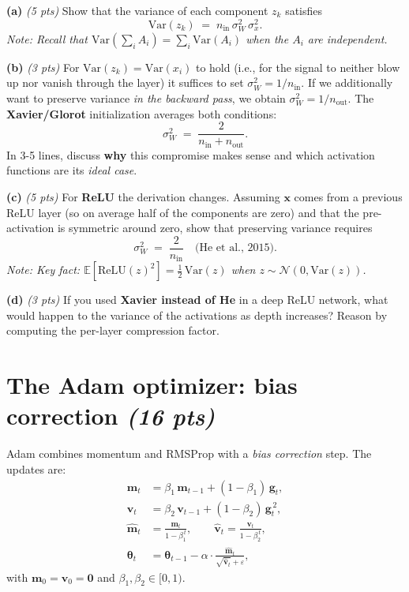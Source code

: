 \documentclass[11pt,letterpaper]{article}
\newcommand{\E}{\mathbb{E}}
\newcommand{\Var}{\mathrm{Var}}
\newcommand{\relu}{\mathrm{ReLU}}
\newcommand{\pts}[1]{\textit{(#1 pts)}\;}
\newcommand{\note}[1]{\textit{\small Note: #1}}
\begin{document}
\textbf{(a)} \pts{5} Show that the variance of each component $z_k$ satisfies
$$
\Var(z_k) \;=\; n_{\text{in}}\, \sigma_W^2\, \sigma_x^2.
$$
\note{Recall that $\Var(\sum_i A_i) = \sum_i \Var(A_i)$ when the $A_i$ are independent.}

\textbf{(b)} \pts{3} For $\Var(z_k) = \Var(x_i)$ to hold (i.e., for the signal
to neither blow up nor vanish through the layer) it suffices to set
$\sigma_W^2 = 1/n_{\text{in}}$. If we additionally want to preserve variance
\emph{in the backward pass}, we obtain $\sigma_W^2 = 1/n_{\text{out}}$. The
\textbf{Xavier/Glorot} initialization averages both conditions:
$$
\sigma_W^2 \;=\; \frac{2}{n_{\text{in}} + n_{\text{out}}}.
$$
In 3-5 lines, discuss \textbf{why} this compromise makes sense and which
activation functions are its \emph{ideal case}.

\textbf{(c)} \pts{5} For \textbf{ReLU} the derivation changes. Assuming
$\mathbf{x}$ comes from a previous ReLU layer (so on average half of the
components are zero) and that the pre-activation is symmetric around zero,
show that preserving variance requires
$$
\sigma_W^2 \;=\; \frac{2}{n_{\text{in}}}\quad \text{(He et al., 2015)}.
$$
\note{Key fact: $\E[\relu(z)^2] = \tfrac{1}{2}\,\Var(z)$ when $z \sim \mathcal{N}(0, \Var(z))$.}

\textbf{(d)} \pts{3} If you used \textbf{Xavier instead of He} in a deep ReLU
network, what would happen to the variance of the activations as depth
increases? Reason by computing the per-layer compression factor.

\section{The Adam optimizer: bias correction \pts{16}}

Adam combines momentum and RMSProp with a \emph{bias correction} step. The
updates are:
\begin{align*}
\mathbf{m}_t &= \beta_1\, \mathbf{m}_{t-1} + (1-\beta_1)\, \mathbf{g}_t, \\
\mathbf{v}_t &= \beta_2\, \mathbf{v}_{t-1} + (1-\beta_2)\, \mathbf{g}_t^{\,2}, \\
\hat{\mathbf{m}}_t &= \frac{\mathbf{m}_t}{1 - \beta_1^{\,t}}, \qquad
\hat{\mathbf{v}}_t = \frac{\mathbf{v}_t}{1 - \beta_2^{\,t}}, \\
\boldsymbol{\theta}_t &= \boldsymbol{\theta}_{t-1}
        - \alpha \cdot \frac{\hat{\mathbf{m}}_t}{\sqrt{\hat{\mathbf{v}}_t} + \varepsilon},
\end{align*}
with $\mathbf{m}_0 = \mathbf{v}_0 = \mathbf{0}$ and $\beta_1, \beta_2 \in [0, 1)$.
\end{document}
